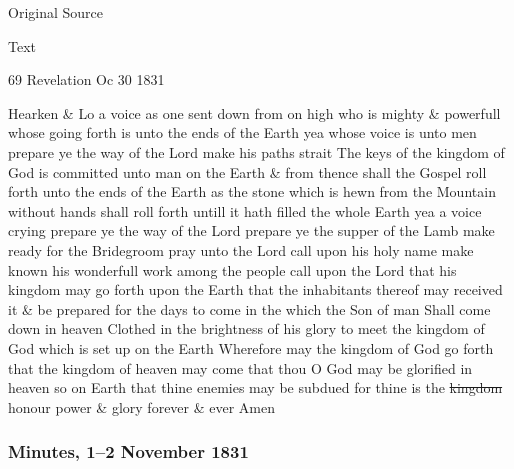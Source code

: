 {			\begin{description}
				\item[Original Source]
			\end{description}
			
			
			\begin{description}
				\item[Text]
			\end{description}
			
				\begin{tightcenter}
				69 Revelation Oc 30 1831
				\end{tightcenter}
				
				Hearken \& Lo a voice as one sent down from on high who is mighty \& powerfull whose going forth is unto the ends of the Earth yea whose voice is unto men prepare ye the way of the Lord make his paths strait The keys of the kingdom of God is committed unto man on the Earth \& from thence shall the Gospel roll forth unto the ends of the Earth as the stone which is hewn from the Mountain without hands shall roll forth untill it hath filled the whole Earth yea a voice crying prepare ye the way of the Lord prepare ye the supper of the Lamb make ready for the Bridegroom pray unto the Lord call upon his holy name make known his wonderfull work among the people call upon the Lord that his kingdom may go forth upon the Earth that the inhabitants thereof may received it \& be prepared for the days to come in the which the Son of man Shall come down in heaven Clothed in the brightness of his glory to meet the kingdom of God which is set up on the Earth Wherefore may the kingdom of God go forth that the kingdom of heaven may come that thou O God may be glorified in heaven so on Earth that thine enemies may be subdued for thine is the \sout{kingdom} honour power \& glory forever \& ever Amen
				
		\subsubsection{Minutes, 1--2 November 1831}
			\label{EMS-1831-JS-1-2-NOV-1831}
		
}
